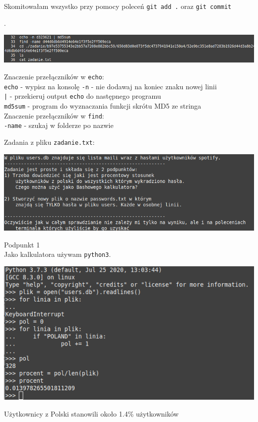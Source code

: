 \documentclass[a4paper]{article}
\begin{document}
\noindent Skomitowałam wszystko przy pomocy poleceń \verb+git add .+ oraz \verb+git commit+

\newpage

.

\begin{center}
    \includegraphics[scale=0.4]{3_3.png}
\end{center}

\noindent Znaczenie przełączników w \verb+echo+: \\
\noindent \verb+echo+ - wypisz na konsolę
\noindent \verb+-n+ - nie dodawaj na koniec znaku nowej linii \\
\noindent \verb+|+ - przekieruj output \verb+echo+ do następnego programu \\
\noindent \verb+md5sum+ - program do wyznaczania funkcji skrótu MD5 ze stringa \\

\noindent Znaczenie przełączników w \verb+find+: \\
\noindent \verb+-name+ - szukaj w folderze po nazwie

Zadania z pliku \verb+zadanie.txt+:

\begin{center}
    \includegraphics[scale=0.4]{zadanie.png}
\end{center}

\noindent Podpunkt 1 \\
\noindent Jako kalkulatora używam \verb+python3+.

\begin{center}
    \includegraphics[scale=0.4]{zadanie1.png}
\end{center}
Użytkownicy z Polski stanowili około 1.4\% użytkowników \\
\end{document}
